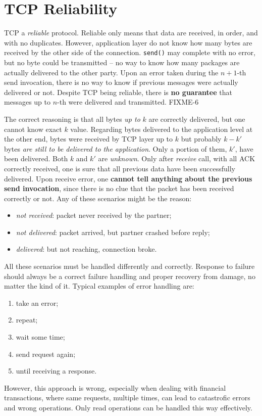 \documentclass[a4paper, 11pt]{report}
\begin{document}
\chapter{TCP Reliability}

TCP a \emph{reliable} protocol. Reliable only means that data are received, in
order, and with no duplicates. However, application layer do not know how many
bytes are received by the other side of the connection. \texttt{send()} may
complete with no error, but no byte could be transmitted \--- no way to know
how many packages are actually delivered to the other party. Upon an error
taken during the $n+1$-th send invocation, there is no way to know if previous
messages were actually delivered or not. Despite TCP being reliable, there is
\textbf{no guarantee} that messages up to $n$-th were delivered and
transmitted. FIXME-6

The correct reasoning is that all bytes \emph{up to} $k$ are correctly
delivered, but one cannot know exact $k$ value. Regarding bytes delivered to
the application level at the other end, bytes were received by TCP layer up to
$k$ but probably $k - k'$ bytes \emph{are still to be delivered to the
application}. Only a portion of them, $k'$, have been delivered. Both $k$ and
$k'$ are \emph{unknown}. Only after \emph{receive} call, with all ACK correctly
received, one is sure that all previous data have been successfully delivered.
Upon receive error, one \textbf{cannot tell anything about the previous send
invocation}, since there is no clue that the packet has been received correctly
or not. Any of these scenarios might be the reason:
\begin{itemize}
    \item \emph{not received}: packet never received by the partner;
    \item \emph{not delivered}: packet arrived, but partner crashed before
        reply;
    \item \emph{delivered}: but not reaching, connection broke.
\end{itemize}

All these scenarios must be handled differently and correctly. Response to
failure should always be a correct failure handling and proper recovery from
damage, no matter the kind of it. Typical examples of error handling are:
\begin{enumerate}
	\item take an error;
    \item repeat;
    \item wait some time;
    \item send request again;
    \item until receiving a response.
\end{enumerate}

However, this approach is wrong, especially when dealing with financial
transactions, where same requests, multiple times, can lead to catastrofic
errors and wrong operations. Only read operations can be handled this way
effectively.
\end{document}
